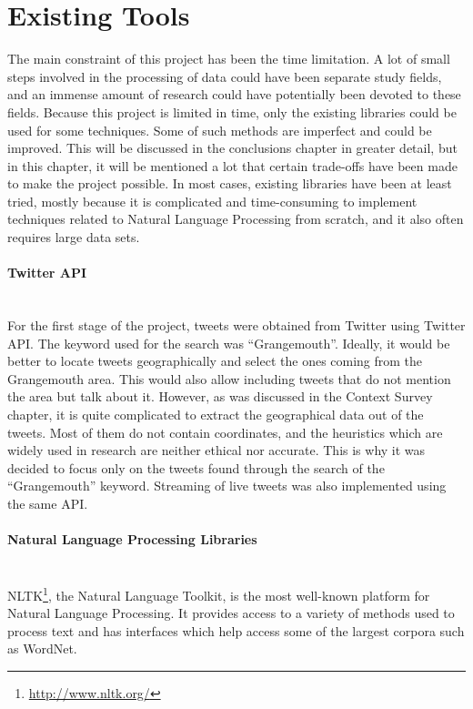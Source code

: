 \section{Existing Tools}
\label{sec:tools}

The main constraint of this project has been the time limitation. A lot of small steps involved in the processing of data could have been separate study fields, and an immense amount of research could have potentially been devoted to these fields. Because this project is limited in time, only the existing libraries could be used for some techniques. Some of such methods are imperfect and could be improved. This will be discussed in the conclusions chapter in greater detail, but in this chapter, it will be mentioned a lot that certain trade-offs have been made to make the project possible. In most cases, existing libraries have been at least tried, mostly because it is complicated and time-consuming to implement techniques related to Natural Language Processing from scratch, and it also often requires large data sets. 

\paragraph{Twitter API}\mbox{}\\
For the first stage of the project, tweets were obtained from Twitter using Twitter API. The keyword used for the search was ``Grangemouth''. Ideally, it would be better to locate tweets geographically and select the ones coming from the Grangemouth area. This would also allow including tweets that do not mention the area but talk about it. However, as was discussed in the Context Survey chapter, it is quite complicated to extract the geographical data out of the tweets. Most of them do not contain coordinates, and the heuristics which are widely used in research are neither ethical nor accurate. This is why it was decided to focus only on the tweets found through the search of the ``Grangemouth'' keyword. Streaming of live tweets was also implemented using the same API.

\paragraph{Natural Language Processing Libraries}\mbox{}\\
NLTK\footnote{\url{http://www.nltk.org/}}, the Natural Language Toolkit, is the most well-known platform for Natural Language Processing. It provides access to a variety of methods used to process text and has interfaces which help access some of the largest corpora such as WordNet.

